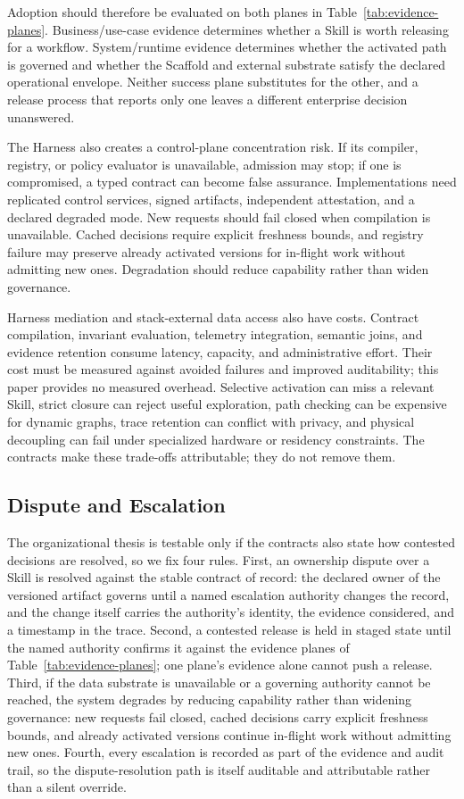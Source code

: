 Adoption should therefore be evaluated on both planes in Table~\ref{tab:evidence-planes}. Business/use-case evidence determines whether a Skill is worth releasing for a workflow. System/runtime evidence determines whether the activated path is governed and whether the Scaffold and external substrate satisfy the declared operational envelope. Neither success plane substitutes for the other, and a release process that reports only one leaves a different enterprise decision unanswered.

The Harness also creates a control-plane concentration risk. If its compiler, registry, or policy evaluator is unavailable, admission may stop; if one is compromised, a typed contract can become false assurance. Implementations need replicated control services, signed artifacts, independent attestation, and a declared degraded mode. New requests should fail closed when compilation is unavailable. Cached decisions require explicit freshness bounds, and registry failure may preserve already activated versions for in-flight work without admitting new ones. Degradation should reduce capability rather than widen governance.

Harness mediation and stack-external data access also have costs. Contract compilation, invariant evaluation, telemetry integration, semantic joins, and evidence retention consume latency, capacity, and administrative effort. Their cost must be measured against avoided failures and improved auditability; this paper provides no measured overhead. Selective activation can miss a relevant Skill, strict closure can reject useful exploration, path checking can be expensive for dynamic graphs, trace retention can conflict with privacy, and physical decoupling can fail under specialized hardware or residency constraints. The contracts make these trade-offs attributable; they do not remove them.

\subsection{Dispute and Escalation}

The organizational thesis is testable only if the contracts also state how contested decisions are resolved, so we fix four rules. First, an ownership dispute over a Skill is resolved against the stable contract of record: the declared owner of the versioned artifact governs until a named escalation authority changes the record, and the change itself carries the authority's identity, the evidence considered, and a timestamp in the trace. Second, a contested release is held in staged state until the named authority confirms it against the evidence planes of Table~\ref{tab:evidence-planes}; one plane's evidence alone cannot push a release. Third, if the data substrate is unavailable or a governing authority cannot be reached, the system degrades by reducing capability rather than widening governance: new requests fail closed, cached decisions carry explicit freshness bounds, and already activated versions continue in-flight work without admitting new ones. Fourth, every escalation is recorded as part of the evidence and audit trail, so the dispute-resolution path is itself auditable and attributable rather than a silent override.

